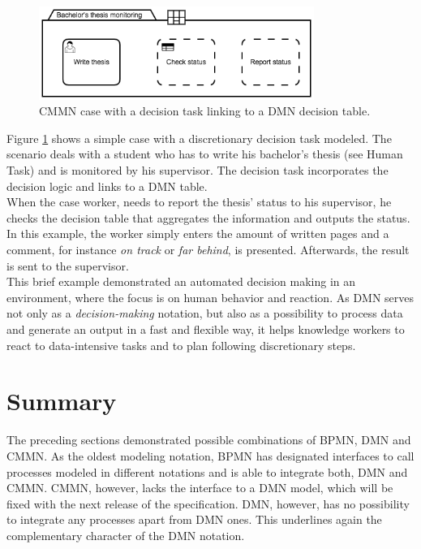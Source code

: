 \begin{figure}
\centering
\includegraphics[width=0.8\textwidth]{../figures/chapter_combinations/CMMN_thesis_decision_task.png} 
\caption{CMMN case with a decision task linking to a DMN decision table.}
\label{fig:CMMN_with_Decision_task}
\end{figure}

Figure \ref{fig:CMMN_with_Decision_task} shows a simple case with a discretionary decision task modeled. The scenario deals with a student who has to write his bachelor's thesis (see Human Task) and is monitored by his supervisor. The decision task incorporates the decision logic and links to a DMN table.\\
 When the case worker, needs to report the thesis' status to his supervisor, he checks the decision table that aggregates the information and outputs the status. In this example, the worker simply enters the amount of written pages and a comment, for instance \textit{on track} or \textit{far behind}, is presented. Afterwards, the result is sent to the supervisor.\\ 
This brief example demonstrated an automated decision making in an environment, where the focus is on human behavior and reaction. As DMN serves not only as a \textit{decision-making} notation, but also as a possibility to process data and generate an output in a fast and flexible way, it helps knowledge workers to react to data-intensive tasks and to plan following discretionary steps. 

\section{Summary}
The preceding sections demonstrated possible combinations of BPMN, DMN and CMMN. As the oldest modeling notation, BPMN has designated interfaces to call processes modeled in different notations and is able to integrate both, DMN and CMMN. CMMN, however, lacks the interface to a DMN model, which will be fixed with the next release of the specification. DMN, however, has no possibility to integrate any processes apart from DMN ones. This underlines again the complementary character of the DMN notation. 

